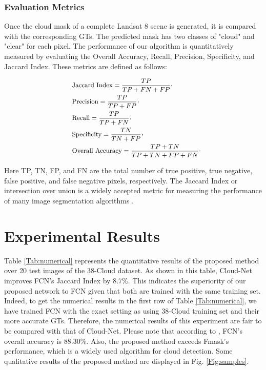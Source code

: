 \documentclass{article}
\begin{document}
\subsubsection{Evaluation Metrics}
Once the cloud mask of a complete Landsat 8 scene is generated, it is compared with the corresponding GTs. The predicted mask has two classes of "cloud" and "clear" for each pixel. The performance of our algorithm is quantitatively measured by evaluating the Overall Accuracy, Recall, Precision, Specificity, and Jaccard Index. These metrics are defined as follows:

\vspace{-5mm}
\begin{equation}
\small
\begin{split}
&\quad \text{Jaccard Index}=\frac{TP}{TP+FN+FP}\raisebox{0.7mm}{,} \\
&\quad \text{Precision}=\frac{TP}{TP+FP}\raisebox{0.7mm}{,} \\
&\quad \text{Recall}=\frac{TP}{TP+FN}\raisebox{0.7mm}{,} \\
&\quad \text{Specificity}=\frac{TN}{TN+FP} \raisebox{0.7mm}{,}\\
&\quad \text{Overall Accuracy}=\frac{TP+TN}{TP+TN+FP+FN} \raisebox{0.7mm}{.}\\
\end{split}
\label{Eq:Ev1}
\end{equation}


Here TP, TN, FP, and FN are the total number of true positive, true negative, false positive, and false negative pixels, respectively. The Jaccard Index or intersection over union is a widely accepted metric for measuring the performance of many image segmentation algorithms \cite{mymmsp}.


\section{Experimental Results}
Table \ref{Tab:numerical} represents the quantitative results of the proposed method over 20 test images of the 38-Cloud dataset. As shown in this table, Cloud-Net improves FCN's Jaccard Index by 8.7\%. This indicates the superiority of our proposed network to FCN given that both are trained with the same training set. Indeed, to get the numerical results in the first row of Table \ref{Tab:numerical}, we have trained FCN with the exact setting as \cite{mymmsp} using 38-Cloud training set and their more accurate GTs. Therefore, the numerical results of this experiment are fair to be compared with that of Cloud-Net. Please note that according to \cite{mymmsp}, FCN's overall accuracy is 88.30\%. Also, the proposed method exceeds Fmask's performance, which is a widely used algorithm for cloud detection. Some qualitative results of the proposed method are displayed in Fig. \ref{Fig:samples}.
\end{document}

